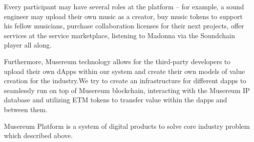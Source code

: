 \documentclass[12pt]{report}
\begin{document}
Every participant may have several roles at the platform – for example, a sound engineer may upload their own music as a creator, buy music tokens to support his fellow musicians, purchase collaboration licenses for their next projects, offer services at the service marketplace, listening to Madonna via the Soundchain player all along.

Furthermore, Musereum technology allows for the third-party developers to upload their own dApps within our system and create their own models of value creation for the industry.We try to create an infrastructure for different dapps to seamlessly run on top of Musereum blockchain, interacting with the Musereum IP database and utilizing ETM tokens to transfer value within the dapps and between them.

Musereum Platform is a system of digital products to solve core industry problem which described above.
\end{document}
